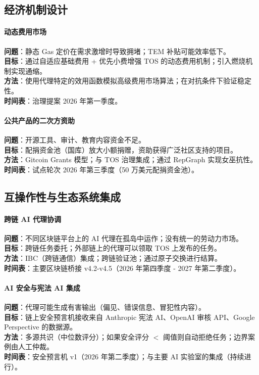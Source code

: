 \documentclass[11pt]{article}
\begin{document}
\subsection{经济机制设计}

\paragraph{动态费用市场}
\textbf{问题}：静态 Gas 定价在需求激增时导致拥堵；TEM 补贴可能效率低下。\\
\textbf{目标}：通过自适应基础费用 + 优先小费增强 TOS 的动态费用机制；引入燃烧机制实现通缩。\\
\textbf{方法}：使用代理特定的效用函数模拟高级费用市场算法；在对抗条件下验证稳定性。\\
\textbf{时间表}：治理提案 2026 年第一季度。

\paragraph{公共产品的二次方资助}
\textbf{问题}：开源工具、审计、教育内容资金不足。\\
\textbf{目标}：配捐资金池（国库）放大小额捐赠，资助获得广泛社区支持的项目。\\
\textbf{方法}：Gitcoin Grants 模型；与 TOS 治理集成；通过 RepGraph 实现女巫抗性。\\
\textbf{时间表}：试点轮次 2026 年第三季度（50 万美元配捐资金池）。

\subsection{互操作性与生态系统集成}

\paragraph{跨链 AI 代理协调}
\textbf{问题}：不同区块链平台上的 AI 代理在孤岛中运作；没有统一的劳动力市场。\\
\textbf{目标}：跨链任务委托；外部链上的代理可以领取 TOS 上发布的任务。\\
\textbf{方法}：IBC（跨链通信）集成；跨链验证池；通过原子交换进行结算。\\
\textbf{时间表}：主要区块链桥接 v4.2-v4.5（2026 年第四季度 - 2027 年第二季度）。

\paragraph{AI 安全与宪法 AI 集成}
\textbf{问题}：代理可能生成有害输出（偏见、错误信息、冒犯性内容）。\\
\textbf{目标}：链上安全预言机接收来自 Anthropic 宪法 AI、OpenAI 审核 API、Google Perspective 的数据源。\\
\textbf{方法}：多源共识（中位数评分）；如果安全评分 $<$ 阈值则自动拒绝任务；边界案例由人工仲裁。\\
\textbf{时间表}：安全预言机 v1（2026 年第二季度）；与主要 AI 实验室的集成（持续进行）。
\end{document}
